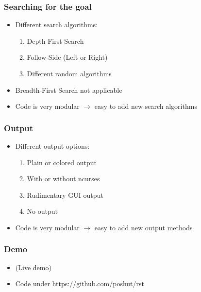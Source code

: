 \documentclass{beamer}
\begin{document}
\begin{frame}
    \frametitle{Searching for the goal}
    \begin{itemize}
        \item Different search algorithms:
            \begin{enumerate}
                \item Depth-First Search
                \item Follow-Side (Left or Right)
                \item Different random algorithms
            \end{enumerate}
        \item Breadth-First Search not applicable
        \item Code is very modular $\rightarrow$ easy to add new search algorithms
    \end{itemize}
\end{frame}

\begin{frame}
    \frametitle{Output}
    \begin{itemize}
        \item Different output options:
            \begin{enumerate}
                \item Plain or colored output
                \item With or without ncurses
                \item Rudimentary GUI output
                \item No output
            \end{enumerate}
        \item Code is very modular $\rightarrow$ easy to add new output methods
    \end{itemize}
\end{frame}
\begin{frame}
    \frametitle{Demo}
    \begin{itemize}
        \item (Live demo)
        \item Code under https://github.com/poshut/rst
    \end{itemize}
\end{frame}
\end{document}

